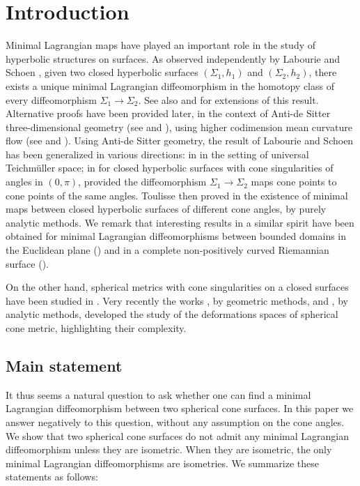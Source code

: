 \section{Introduction}

Minimal Lagrangian maps have played an important role in the study of hyperbolic structures on surfaces. As observed independently by Labourie \cite{labourieCP} and Schoen \cite{Schoenharmonic}, given two closed hyperbolic surfaces $(\Sigma_1,h_1)$ and $(\Sigma_2,h_2)$, there exists a unique minimal Lagrangian diffeomorphism in the homotopy class of every diffeomorphism $\Sigma_1\to\Sigma_2$. See also \cite{zbMATH00827487} and \cite{zbMATH00870993,graham} for extensions of this result. Alternative proofs have been provided later, in the context of Anti-de Sitter three-dimensional geometry (see \cite{foliationCMC} and \cite[\S 7]{survey}), using higher codimension mean curvature flow (see \cite{zbMATH01744223} and \cite{zbMATH05996706}). Using Anti-de Sitter geometry, the result of Labourie and Schoen has been generalized in various directions: in \cite{bon_schl,zbMATH06902491} in the setting of universal Teichmüller space; in \cite{zbMATH06680278} for closed hyperbolic surfaces with cone singularities of angles in $(0,\pi)$, provided the diffeomorphism $\Sigma_1\to\Sigma_2$ maps cone points to cone points of the same angles. Toulisse then proved in \cite{zbMATH07149810} the existence of minimal maps between closed hyperbolic surfaces of different cone angles, by purely analytic methods. We remark that interesting results in a similar spirit have been obtained for minimal Lagrangian diffeomorphisms between bounded domains in the Euclidean plane (\cite{zbMATH00032290,zbMATH01145655}) and in a complete non-positively curved Riemannian surface (\cite{zbMATH05346543}).

On the other hand, spherical metrics with cone singularities on a closed surfaces have been studied in \cite{zbMATH03988171,zbMATH04073390,zbMATH04142953,zbMATH04194621,zbMATH00126050}. Very recently the works \cite{zbMATH06992339,zbMATH07091755,mondpanov2}, by geometric methods, and \cite{zbMATH06741332,zbMATH07197533,mazzeozhu2}, by analytic methods, developed the study of the deformations spaces of spherical cone metric, highlighting their complexity.

\subsection{Main statement}

It thus seems a natural question to ask whether one can find a minimal Lagrangian diffeomorphism between two spherical cone surfaces. In this paper we answer negatively to this question, without any assumption on the cone angles. We show that two spherical cone surfaces do not admit any minimal Lagrangian diffeomorphism unless they are isometric. When they are isometric, the only minimal Lagrangian diffeomorphisms are isometries. We summarize these statements as follows:

